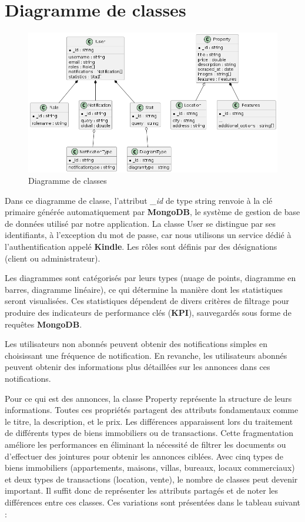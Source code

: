 \documentclass[a4paper,12pt]{report}
\numberwithin{equation}{section}
\begin{document}
\section{Diagramme de classes}
\vspace{0.5cm}
\begin{figure}[h]
    \centering
        \includegraphics[width=\textwidth]{class.png}
    \caption{Diagramme de classes}
\end{figure}
\par Dans ce diagramme de classe, l'attribut \textit{\_id} de type string renvoie à la clé primaire générée automatiquement par \textbf{MongoDB}, le système de gestion de base de données utilisé par notre application. La classe User se distingue par ses identifiants, à l'exception du mot de passe, car nous utilisons un service dédié à l'authentification appelé \textbf{Kindle}. Les rôles sont définis par des désignations (client ou administrateur).
\\ \par
Les diagrammes sont catégorisés par leurs types (nuage de points, diagramme en barres, diagramme linéaire), ce qui détermine la manière dont les statistiques seront visualisées. Ces statistiques dépendent de divers critères de filtrage pour produire des indicateurs de performance clés (\textbf{KPI}), sauvegardés sous forme de requêtes \textbf{MongoDB}.
\\ \par
Les utilisateurs non abonnés peuvent obtenir des notifications simples en choisissant une fréquence de notification. En revanche, les utilisateurs abonnés peuvent obtenir des informations plus détaillées sur les annonces dans ces notifications.
\\ \par
Pour ce qui est des annonces, la classe Property représente la structure de leurs informations. Toutes ces propriétés partagent des attributs fondamentaux comme le titre, la description, et le prix. Les différences apparaissent lors du traitement de différents types de biens immobiliers ou de transactions. Cette fragmentation améliore les performances en éliminant la nécessité de filtrer les documents ou d'effectuer des jointures pour obtenir les annonces ciblées. Avec cinq types de biens immobiliers (appartements, maisons, villas, bureaux, locaux commerciaux) et deux types de transactions (location, vente), le nombre de classes peut devenir important. Il suffit donc de représenter les attributs partagés et de noter les différences entre ces classes. Ces variations sont présentées dans le tableau suivant :
\end{document}
